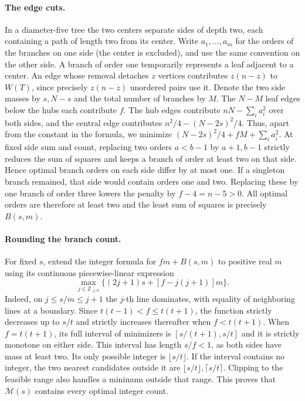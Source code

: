 \documentclass[11pt,a4paper]{article}
\begin{document}
\paragraph{The edge cuts.}
In a diameter-five tree the two centers separate sides of depth two,
each containing a path of length two from its center. Write \(a_1,\ldots,a_m\)
for the orders of the branches on one side (the center is excluded),
and use the same convention on the other side. A branch of order one
temporarily represents a leaf adjacent to a center. An edge whose removal
detaches \(z\) vertices contributes \(z(n-z)\) to \(W(T)\), since precisely
\(z(n-z)\) unordered pairs use it. Denote the two side masses by \(s,N-s\)
and the total number of branches by \(M\). The \(N-M\) leaf edges below
the hubs each contribute \(f\). The hub edges contribute
\(nN-\sum_i a_i^2\) over both sides, and the central edge contributes
\(n^2/4-(N-2s)^2/4\). Thus, apart from the constant in the formula, we
minimize \((N-2s)^2/4+fM+\sum_i a_i^2\).
At fixed side sum and count, replacing two orders \(a<b-1\) by
\(a+1,b-1\) strictly reduces the sum of squares and keeps a branch of
order at least two on that side. Hence optimal branch orders on each
side differ by at most one. If a singleton branch remained, that side
would contain orders one and two. Replacing these by one branch of order
three lowers the penalty by \(f-4=n-5>0\). All optimal orders are therefore
at least two and the least sum of squares is precisely \(B(s,m)\).

\paragraph{Rounding the branch count.}
For fixed \(s\), extend the integer formula for \(fm+B(s,m)\) to positive
real \(m\) using its continuous piecewise-linear expression
\[
      \max_{j\in\mathbb Z_{\ge0}}
              \big\{(2j+1)s+[f-j(j+1)]m\big\}.
\]
Indeed, on \(j\le s/m\le j+1\) the \(j\)-th line dominates, with equality
of neighboring lines at a boundary. Since \(t(t-1)<f\le t(t+1)\), the
function strictly decreases up to \(s/t\) and strictly increases thereafter
when \(f<t(t+1)\).
When \(f=t(t+1)\), its full interval of minimizers is
\([s/(t+1),s/t]\) and it is strictly monotone on either side.
This interval has length \(s/f<1\), as both sides have mass at least two.
Its only possible integer is \(\lfloor s/t\rfloor\). If the interval
contains no integer, the two nearest candidates outside it are
\(\lfloor s/t\rfloor,\lceil s/t\rceil\). Clipping to the feasible range
also handles a minimum outside that range. This proves that \(\mathcal M(s)\)
contains every optimal integer count.
\end{document}
